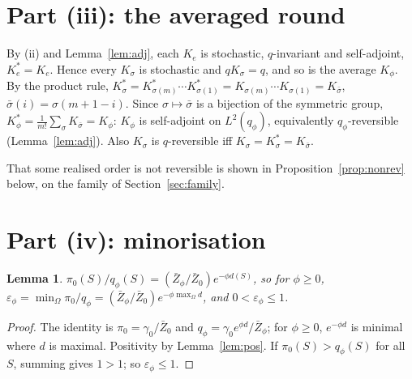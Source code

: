 \documentclass[11pt]{article}
\newtheorem{lemma}[theorem]{Lemma}
\theoremstyle{remark}
\newcommand{\Om}{\Omega}
\newcommand{\eps}{\varepsilon}
\newcommand{\Zb}{\bar Z}
\begin{document}
\section{Part (iii): the averaged round}

By (ii) and Lemma~\ref{lem:adj}, each $K_e$ is stochastic, $q$-invariant and self-adjoint, $K_e^*=K_e$. Hence every $K_\sigma$ is stochastic and $qK_\sigma=q$, and so is the average $K_\phi$. By the product rule, $K_\sigma^*=K_{\sigma(m)}^*\cdots K_{\sigma(1)}^*=K_{\sigma(m)}\cdots K_{\sigma(1)}=K_{\bar\sigma}$, $\bar\sigma(i)=\sigma(m+1-i)$. Since $\sigma\mapsto\bar\sigma$ is a bijection of the symmetric group,
$K_\phi^*=\frac1{m!}\sum_\sigma K_{\bar\sigma}=K_\phi$: $K_\phi$ is self-adjoint on $L^2(q_\phi)$, equivalently $q_\phi$-reversible (Lemma~\ref{lem:adj}). Also $K_\sigma$ is $q$-reversible iff $K_\sigma=K_\sigma^*=K_{\bar\sigma}$.

That some realised order is not reversible is shown in Proposition~\ref{prop:nonrev} below, on the family of Section~\ref{sec:family}.

\section{Part (iv): minorisation}

\begin{lemma}\label{lem:eps}
$\pi_0(S)/q_\phi(S)=(\Zb_\phi/\Zb_0)e^{-\phi d(S)}$, so for $\phi\ge0$, $\eps_\phi=\min_\Om\pi_0/q_\phi=(\Zb_\phi/\Zb_0)e^{-\phi\max_\Om d}$, and $0<\eps_\phi\le1$.
\end{lemma}
\begin{proof}
The identity is $\pi_0=\gamma_0/\Zb_0$ and $q_\phi=\gamma_0e^{\phi d}/\Zb_\phi$; for $\phi\ge0$, $e^{-\phi d}$ is minimal where $d$ is maximal. Positivity by Lemma~\ref{lem:pos}. If $\pi_0(S)>q_\phi(S)$ for all $S$, summing gives $1>1$; so $\eps_\phi\le1$.
\end{proof}
\end{document}
